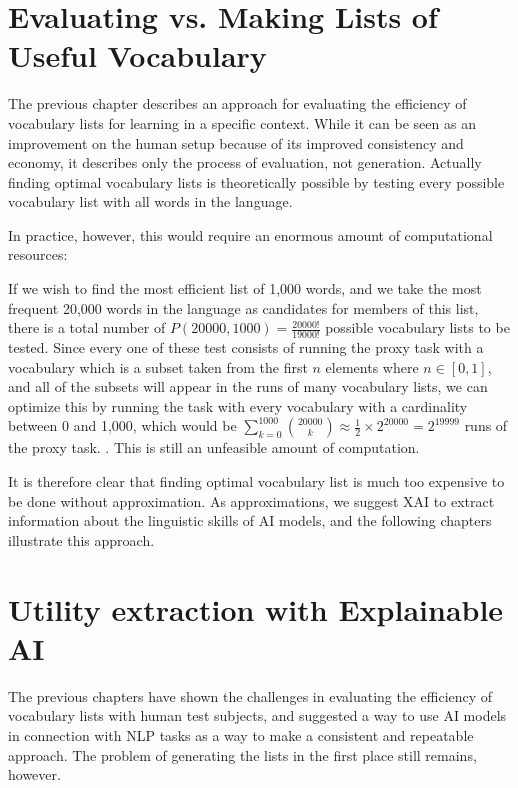 \section{Evaluating vs. Making Lists of Useful Vocabulary} \label{sec:eval-vs-creation}
The previous chapter describes an approach for evaluating the efficiency of vocabulary lists for learning in a specific context.
While it can be seen as an improvement on the human setup because of its improved consistency and economy, it describes only the process of evaluation, not generation.
Actually finding optimal vocabulary lists is theoretically possible by testing every possible vocabulary list with all words in the language.

In practice, however, this would require an enormous amount of computational resources:

If we wish to find the most efficient list of 1,000 words, and we take the most frequent 20,000 words in the language as candidates for members of this list, there is a total number of $P(20000, 1000) = \frac{20000!}{19000!}$ possible vocabulary lists to be tested.
Since every one of these test consists of running the proxy task with a vocabulary which is a subset taken from the first $n$ elements where $n \in [0, 1]$, and all of the subsets will appear in the runs of many vocabulary lists, we can optimize this by running the task with every vocabulary with a cardinality between 0 and 1,000, which would be
$
	\sum_{k=0}^{1000} \binom{20000}{k} \approx \frac{1}{2} \times 2^{20000} = 2^{19999}
$ runs of the proxy task.
.
This is still an unfeasible amount of computation.

It is therefore clear that finding optimal vocabulary list is much too expensive to be done without approximation.
As approximations, we suggest XAI to extract information about the linguistic skills of AI models, and the following chapters illustrate this approach.

\section{Utility extraction with Explainable AI} \label{sec:utility-extraction-with-xai}

The previous chapters have shown the challenges in evaluating the efficiency of vocabulary lists with human test subjects, and suggested a way to use AI models in connection with NLP tasks as a way to make a consistent and repeatable approach.
The problem of generating the lists in the first place still remains, however.

